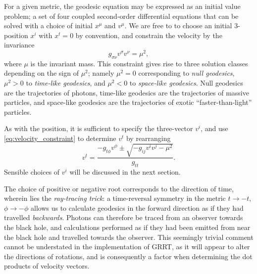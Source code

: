 \documentclass[fleqn,usenatbib]{mnras}
\newcommand{\vel}[1]{v^{#1}}
\begin{document}
For a given metric, the geodesic equation may be expressed as an initial value
problem; a set of four coupled second-order differential equations that can be
solved with a choice of initial $x^\mu$ and $\vel{\mu}$. We are free to to
choose an initial 3-position $x^i$ with $x^t = 0$ by convention, and constrain
the velocity by the invariance
\begin{equation}
\label{eq:velocity_constraint}
    g_{\sigma\nu} \vel{\sigma} \vel{\nu} = \mu^2,
\end{equation}
where $\mu$ is the invariant mass. This constraint gives rise to three solution
classes depending on the sign of $\mu^2$; namely $\mu^2 = 0$ corresponding to
\emph{null geodesics}, $\mu^2 > 0$ to \emph{time-like geodesics}, and $\mu^2 <
0$ to \emph{space-like geodesics}. Null geodesics are the trajectories of
photons, time-like geodesics are the trajectories of massive particles, and
space-like geodesics are the trajectories of exotic ``faster-than-light''
particles.

As with the position, it is sufficient to specify the three-vector $\vel{i}$,
and use \eqref{eq:velocity_constraint} to determine $\vel{t}$ by rearranging
\begin{equation}
\vel{t}  = \frac{-g_{t\phi} \vel{\phi} \pm
    \sqrt{-g_{ij} \vel{i} \vel{j} - \mu^2}
}{g_{tt}}.
\end{equation}
Sensible choices of $v^i$ will be discussed in the next section.

The choice of positive or negative root corresponds to the direction of time,
wherein lies the \textit{ray-tracing trick}: a time-reversal symmetry in the
metric $t \rightarrow -t$, $\phi \rightarrow -\phi$ allows us to calculate
geodesics in the forward direction as if they had travelled \textit{backwards}.
Photons can therefore be traced from an observer towards the black hole, and
calculations performed as if they had been emitted from near the black hole and
travelled towards the observer. This seemingly trivial comment cannot be
understated in the implementation of GRRT, as it will appear to alter the
directions of rotations, and is consequently a factor when determining the dot
products of velocity vectors.
\end{document}
